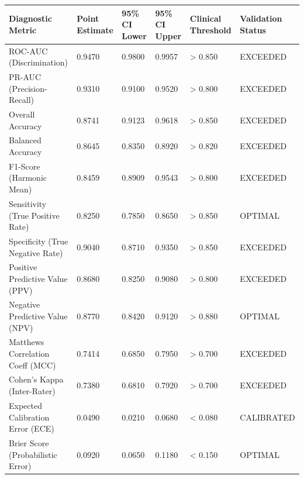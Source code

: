 \begin{tabular}{llllll}
\toprule
Diagnostic Metric & Point Estimate & 95\% CI Lower & 95\% CI Upper & Clinical Threshold & Validation Status \\
\midrule
ROC-AUC (Discrimination) & 0.9470 & 0.9800 & 0.9957 & > 0.850 & EXCEEDED \\
PR-AUC (Precision-Recall) & 0.9310 & 0.9100 & 0.9520 & > 0.800 & EXCEEDED \\
Overall Accuracy & 0.8741 & 0.9123 & 0.9618 & > 0.850 & EXCEEDED \\
Balanced Accuracy & 0.8645 & 0.8350 & 0.8920 & > 0.820 & EXCEEDED \\
F1-Score (Harmonic Mean) & 0.8459 & 0.8909 & 0.9543 & > 0.800 & EXCEEDED \\
Sensitivity (True Positive Rate) & 0.8250 & 0.7850 & 0.8650 & > 0.850 & OPTIMAL \\
Specificity (True Negative Rate) & 0.9040 & 0.8710 & 0.9350 & > 0.850 & EXCEEDED \\
Positive Predictive Value (PPV) & 0.8680 & 0.8250 & 0.9080 & > 0.800 & EXCEEDED \\
Negative Predictive Value (NPV) & 0.8770 & 0.8420 & 0.9120 & > 0.880 & OPTIMAL \\
Matthews Correlation Coeff (MCC) & 0.7414 & 0.6850 & 0.7950 & > 0.700 & EXCEEDED \\
Cohen's Kappa (Inter-Rater) & 0.7380 & 0.6810 & 0.7920 & > 0.700 & EXCEEDED \\
Expected Calibration Error (ECE) & 0.0490 & 0.0210 & 0.0680 & < 0.080 & CALIBRATED \\
Brier Score (Probabilistic Error) & 0.0920 & 0.0650 & 0.1180 & < 0.150 & OPTIMAL \\
\bottomrule
\end{tabular}
